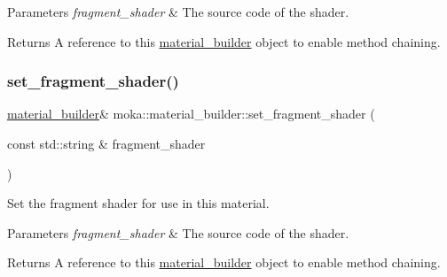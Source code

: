 \begin{DoxyParams}{Parameters}
{\em fragment\+\_\+shader} & The source code of the shader. \\
\hline
\end{DoxyParams}
\begin{DoxyReturn}{Returns}
A reference to this \mbox{\hyperlink{classmoka_1_1material__builder}{material\+\_\+builder}} object to enable method chaining. 
\end{DoxyReturn}
\mbox{\label{classmoka_1_1material__builder_a241303620910f8f1cd2b9e7cd9028676}} 
\subsubsection{\texorpdfstring{set\_fragment\_shader()}{set\_fragment\_shader()}\hspace{0.1cm}{\footnotesize\ttfamily [3/3]}}
{\footnotesize\ttfamily \mbox{\hyperlink{classmoka_1_1material__builder}{material\+\_\+builder}}\& moka\+::material\+\_\+builder\+::set\+\_\+fragment\+\_\+shader (\begin{DoxyParamCaption}\item[{const std\+::string \&}]{fragment\+\_\+shader }\end{DoxyParamCaption})}



Set the fragment shader for use in this material. 


\begin{DoxyParams}{Parameters}
{\em fragment\+\_\+shader} & The source code of the shader. \\
\hline
\end{DoxyParams}
\begin{DoxyReturn}{Returns}
A reference to this \mbox{\hyperlink{classmoka_1_1material__builder}{material\+\_\+builder}} object to enable method chaining. 
\end{DoxyReturn}
\mbox{\label{classmoka_1_1material__builder_a19080392d3e2aca73feb566ff088a956}} 
